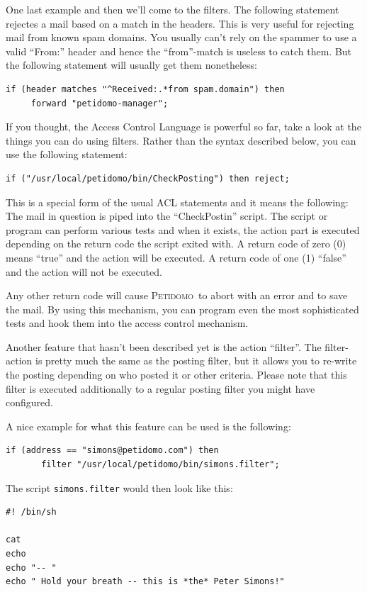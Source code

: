 \documentclass[a4paper]{report}
\newcommand{\Petidomo}{{\scshape Peti\-domo}}
\newcommand{\file}[1]{{\tt #1}}
\begin{document}
One last example and then we'll come to the filters. The following
statement rejectes a mail based on a match in the headers. This is
very useful for rejecting mail from known spam domains. You usually
can't rely on the spammer to use a valid ``From:'' header and hence
the ``from''-match is useless to catch them. But the following
statement will usually get them nonetheless:
\begin{verbatim}
if (header matches "^Received:.*from spam.domain") then
     forward "petidomo-manager";
\end{verbatim}

\bigskip

If you thought, the Access Control Language is powerful so far, take a
look at the things you can do using filters. Rather than the syntax
described below, you can use the following statement:
\begin{verbatim}
if ("/usr/local/petidomo/bin/CheckPosting") then reject;
\end{verbatim}

This is a special form of the usual ACL statements and it means the
following: The mail in question is piped into the ``CheckPostin''
script. The script or program can perform various tests and when it
exists, the action part is executed depending on the return code the
script exited with. A return code of zero (0) means ``true'' and the
action will be executed. A return code of one (1) ``false'' and the
action will not be executed.

Any other return code will cause \Petidomo\ to abort with an error and
to save the mail. By using this mechanism, you can program even the
most sophisticated tests and hook them into the access control
mechanism.

Another feature that hasn't been described yet is the action
``filter''. The filter-action is pretty much the same as the posting
filter, but it allows you to re-write the posting depending on who
posted it or other criteria. Please note that this filter is executed
additionally to a regular posting filter you might have configured.

A nice example for what this feature can be used is the following:
\begin{verbatim}
if (address == "simons@petidomo.com") then
       filter "/usr/local/petidomo/bin/simons.filter";
\end{verbatim}

The script \file{simons.filter} would then look like this:
\begin{verbatim}
#! /bin/sh

cat
echo
echo "-- "
echo " Hold your breath -- this is *the* Peter Simons!"
\end{verbatim}
\end{document}
